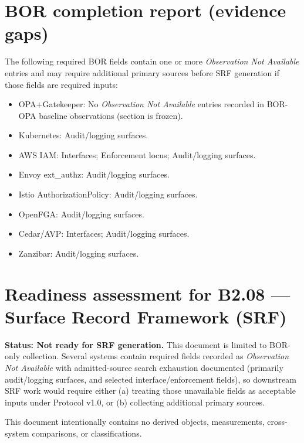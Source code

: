 \documentclass[11pt]{article}
\begin{document}
\section*{BOR completion report (evidence gaps)}
The following required BOR fields contain one or more \emph{Observation Not Available} entries and may require additional primary sources before SRF generation if those fields are required inputs:
\begin{itemize}[leftmargin=*]
  \item OPA+Gatekeeper: No \emph{Observation Not Available} entries recorded in BOR-OPA baseline observations (section is frozen).
  \item Kubernetes: Audit/logging surfaces.
  \item AWS IAM: Interfaces; Enforcement locus; Audit/logging surfaces.
  \item Envoy ext\_authz: Audit/logging surfaces.
  \item Istio AuthorizationPolicy: Audit/logging surfaces.
  \item OpenFGA: Audit/logging surfaces.
  \item Cedar/AVP: Interfaces; Audit/logging surfaces.
  \item Zanzibar: Audit/logging surfaces.
\end{itemize}

\section*{Readiness assessment for B2.08 --- Surface Record Framework (SRF)}
\textbf{Status: Not ready for SRF generation.} This document is limited to BOR-only collection. Several systems contain required fields recorded as \emph{Observation Not Available} with admitted-source search exhaustion documented (primarily audit/logging surfaces, and selected interface/enforcement fields), so downstream SRF work would require either (a) treating those unavailable fields as acceptable inputs under Protocol v1.0, or (b) collecting additional primary sources.

This document intentionally contains no derived objects, measurements, cross-system comparisons, or classifications.
\end{document}
